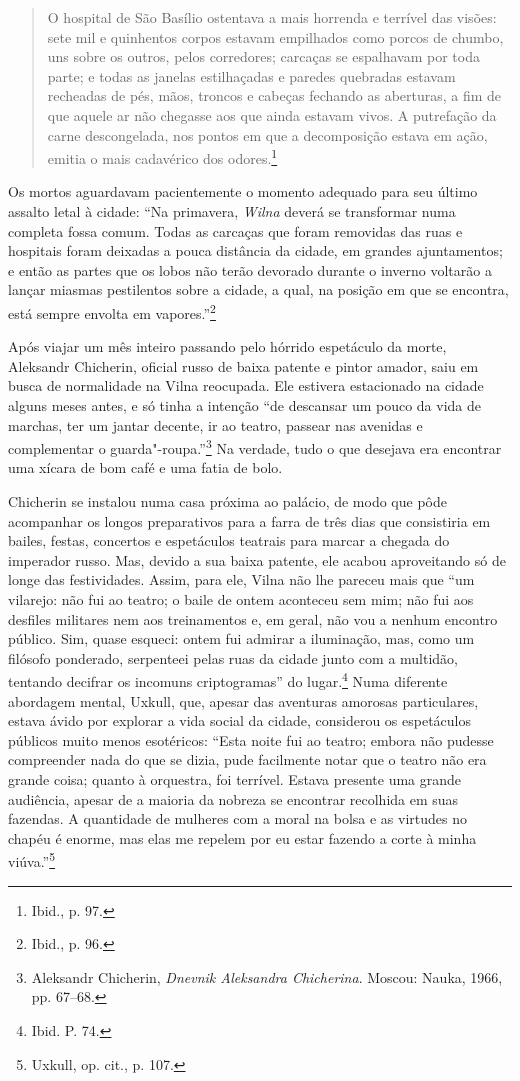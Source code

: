 \begin{quote}
O hospital de São Basílio ostentava a mais horrenda e terrível das
visões: sete mil e quinhentos corpos estavam empilhados como porcos de
chumbo, uns sobre os outros, pelos corredores; carcaças se espalhavam
por toda parte; e todas as janelas estilhaçadas e paredes quebradas
estavam recheadas de pés, mãos, troncos e cabeças fechando as aberturas,
a fim de que aquele ar não chegasse aos que ainda estavam vivos. A
putrefação da carne descongelada, nos pontos em que a decomposição
estava em ação, emitia o mais cadavérico dos odores.\footnote{Ibid., p. 97.}
\end{quote}  

Os mortos aguardavam pacientemente o momento adequado para seu último
assalto letal à cidade: ``Na primavera, \textit{Wilna} deverá se transformar numa
completa fossa comum. Todas as carcaças que foram removidas das ruas e
hospitais foram deixadas a pouca distância da cidade, em grandes
ajuntamentos; e então as partes que os lobos não terão devorado durante
o inverno voltarão a lançar miasmas pestilentos sobre a cidade, a qual,
na posição em que se encontra, está sempre envolta em
vapores.''\footnote{Ibid., p. 96.}

Após viajar um mês inteiro passando pelo hórrido espetáculo da morte,
Aleksandr Chicherin, oficial russo de baixa patente e pintor amador,
saiu em busca de normalidade na Vilna reocupada. Ele estivera
estacionado na cidade alguns meses antes, e só tinha a intenção ``de
descansar um pouco da vida de marchas, ter um jantar decente, ir ao
teatro, passear nas avenidas e complementar o guarda"-roupa.''\footnote{Aleksandr Chicherin, \textit{Dnevnik Aleksandra Chicherina}. Moscou: Nauka, 1966, pp. 67--68.} Na verdade, tudo o que desejava era encontrar uma xícara de bom café e uma
fatia de bolo.

Chicherin se instalou numa casa próxima ao palácio, de modo que pôde
acompanhar os longos preparativos para a farra de três dias que
consistiria em bailes, festas, concertos e espetáculos teatrais para
marcar a chegada do imperador russo. Mas, devido a sua baixa patente,
ele acabou aproveitando só de longe das festividades. Assim, para ele,
Vilna não lhe pareceu mais que ``um vilarejo: não fui ao teatro; o baile
de ontem aconteceu sem mim; não fui aos desfiles militares nem aos
treinamentos e, em geral, não vou a nenhum encontro público. Sim, quase
esqueci: ontem fui admirar a iluminação, mas, como um filósofo
ponderado, serpenteei pelas ruas da cidade junto com a multidão,
tentando decifrar os incomuns criptogramas'' do lugar.\footnote{Ibid. P. 74.} Numa diferente abordagem mental, Uxkull, que, apesar das aventuras amorosas particulares, estava ávido por explorar a vida social
da cidade, considerou os espetáculos públicos muito menos esotéricos:
``Esta noite fui ao teatro; embora não pudesse compreender nada do que
se dizia, pude facilmente notar que o teatro não era grande coisa;
quanto à orquestra, foi terrível. Estava presente uma grande audiência,
apesar de a maioria da nobreza se encontrar recolhida em suas fazendas.
A quantidade de mulheres com a moral na bolsa e as virtudes no chapéu é
enorme, mas elas me repelem por eu estar fazendo a corte à minha
viúva.''\footnote{Uxkull, op. cit., p. 107.}

